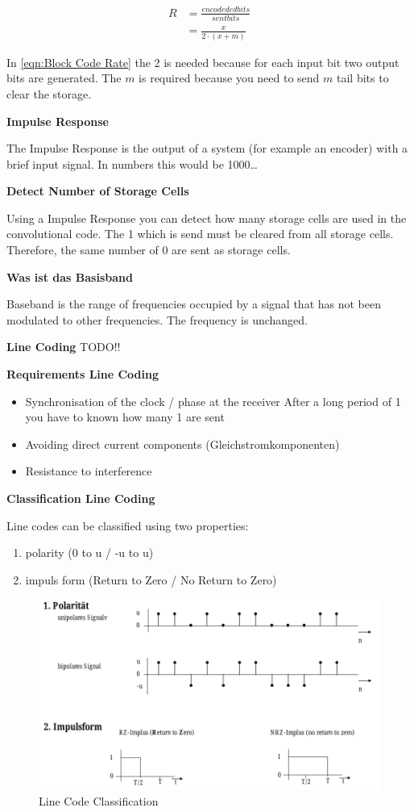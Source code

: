 \documentclass[11pt,twoside,twocolumn,landscape]{article}
\begin{document}
\begin{align}
  R &= \frac{encodeded bits}{sent bits} \\
  &= \frac{x}{2 \cdot (x + m)} \label{eqn:Block Code Rate}
\end{align}

In \ref{eqn:Block Code Rate} the 2 is needed because for each input bit two output bits are generated.
The \(m\) is required because you need to send \(m\) tail bits to clear the storage. 

\textbf{Impulse Response}

The Impulse Response is the output of a system (for example an encoder) with a brief input signal.
In numbers this would be 1000\ldots{}

\textbf{Detect Number of Storage Cells}

Using a Impulse Response you can detect how many storage cells are used in the convolutional code.
The 1 which is send must be cleared from all storage cells.
Therefore, the same number of 0 are sent as storage cells.

\textbf{Was ist das Basisband}

Baseband is the range of frequencies occupied by a signal that has not been modulated to other frequencies.
The frequency is unchanged.

\textbf{Line Coding}
TODO!!

\textbf{Requirements Line Coding}

\begin{itemize}
\item Synchronisation of the clock / phase at the receiver
After a long period of 1 you have to known how many 1 are sent
\item Avoiding direct current components (Gleichstromkomponenten)
\item Resistance to interference
\end{itemize}


\textbf{Classification Line Coding}

Line codes can be classified using two properties:
\begin{enumerate}
\item polarity (0 to u / -u to u)
\item impuls form (Return to Zero / No Return to Zero)
\end{enumerate}


\begin{figure}[htbp]
\centering
\includegraphics[width=.9\linewidth]{img/line_code_classification.png}
\caption{Line Code Classification}
\end{figure}
\end{document}
